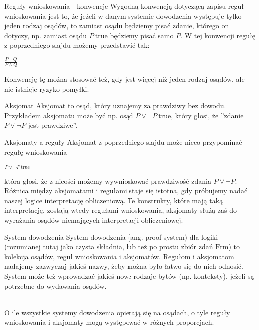 \documentclass{beamer}
\begin{document}
\begin{frame}{Reguły wnioskowania - konwencje}
	Wygodną konwencją dotyczącą zapisu reguł wnioskowania jest to, że jeżeli w danym systemie dowodzenia występuje tylko jeden rodzaj osądów, to zamiast osądu będziemy pisać zdanie, którego on dotyczy, np. zamiast osądu $P \ \text{true}$ będziemy pisać samo $P$. W tej konwencji regułę z poprzedniego slajdu możemy przedstawić tak: \\
	
	\begin{center}
		$\displaystyle \frac{P \quad Q}{P \land Q}$
	\end{center}
	
	Konwencję tę można stosować też, gdy jest więcej niż jeden rodzaj osądów, ale nie istnieje ryzyko pomyłki.
\end{frame}

\begin{frame}{Aksjomat}
	Aksjomat to osąd, który uznajemy za prawdziwy bez dowodu. Przykładem aksjomatu może być np. osąd $P \lor \neg P \ \text{true}$, który głosi, że ''zdanie $P \lor \neg P$ jest prawdziwe''.
\end{frame}

\begin{frame}{Aksjomaty a reguły}
	Aksjomat z poprzedniego slajdu może nieco przypominać regułę wnioskowania \\
	
	\begin{center}
		$\displaystyle \frac{}{P \lor \neg P \ \text{true}}$
	\end{center}
	
	która głosi, że z nicości możemy wywnioskować prawdziwość zdania $P \lor \neg P$. Różnica między aksjomatami i regułami staje się istotna, gdy próbujemy nadać naszej logice interpretację obliczeniową. Te konstrukty, które mają taką interpretację, zostają wtedy regułami wnioskowania, aksjomaty służą zaś do wyrażania osądów niemających interpretacji obliczeniowej.
\end{frame}

\begin{frame}{System dowodzenia}
	System dowodzenia (ang. proof system) dla logiki (rozumianej tutaj jako czysta składnia, lub też po prostu zbiór zdań $\text{Frm}$) to kolekcja osądów, reguł wnioskowania i aksjomatów. Regułom i aksjomatom nadajemy zazwyczaj jakieś nazwy, żeby można było łatwo się do nich odnosić. System może też wprowadzać jakieś nowe rodzaje bytów (np. konteksty), jeżeli są potrzebne do wydawania osądów. \\~\
	
	O ile wszystkie systemy dowodzenia opierają się na osądach, o tyle reguły wnioskowania i aksjomaty mogą występować w różnych proporcjach.
\end{frame}
\end{document}
